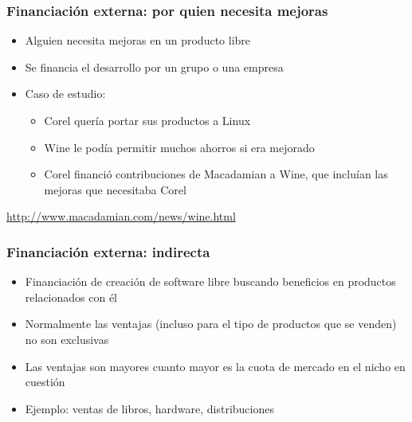 
\begin{frame}
\frametitle{Financiación externa: por quien necesita mejoras}

\begin{itemize}
\item Alguien necesita mejoras en un producto libre
\item Se financia el desarrollo por un grupo o una empresa
\item Caso de estudio:
  \begin{itemize}
  \item Corel quería portar sus productos a Linux
  \item Wine le podía permitir muchos ahorros si era mejorado
  \item Corel financió contribuciones de Macadamian a Wine, que
    incluían las mejoras que necesitaba Corel
  \end{itemize}
\end{itemize}

\begin{flushright}
\url{http://www.macadamian.com/news/wine.html}
\end{flushright}
\end{frame}


\begin{frame}
\frametitle{Financiación externa: indirecta}

\begin{itemize}
\item Financiación de creación de software libre buscando beneficios
  en productos relacionados con él
\item Normalmente las ventajas (incluso para el tipo de productos que
  se venden) no son exclusivas 
\item Las ventajas son mayores cuanto mayor es la cuota de mercado en
  el nicho en cuestión
\item Ejemplo: ventas de libros, hardware, distribuciones
\end{itemize}
\end{frame}


